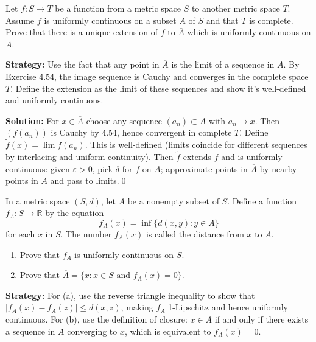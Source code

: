 \begin{problembox}
\begin{problemstatement}
Let $f : S \to T$ be a function from a metric space $S$ to another metric space $T$. Assume $f$ is uniformly continuous on a subset $A$ of $S$ and that $T$ is complete. Prove that there is a unique extension of $f$ to $\overline{A}$ which is uniformly continuous on $\overline{A}$.
\end{problemstatement}
\end{problembox}

\noindent\textbf{Strategy:} Use the fact that any point in $\overline{A}$ is the limit of a sequence in $A$. By Exercise 4.54, the image sequence is Cauchy and converges in the complete space $T$. Define the extension as the limit of these sequences and show it's well-defined and uniformly continuous.

\bigskip\noindent\textbf{Solution:}
For $x\in\overline{A}$ choose any sequence $(a_n)\subset A$ with $a_n\to x$. Then $(f(a_n))$ is Cauchy by 4.54, hence convergent in complete $T$. Define $\tilde f(x)=\lim f(a_n)$. This is well-defined (limits coincide for different sequences by interlacing and uniform continuity). Then $\tilde f$ extends $f$ and is uniformly continuous: given $\varepsilon>0$, pick $\delta$ for $f$ on $A$; approximate points in $\overline{A}$ by nearby points in $A$ and pass to limits.\qed



\begin{problembox}
\begin{problemstatement}
In a metric space $(S, d)$, let $A$ be a nonempty subset of $S$. Define a function $f_A : S \to \mathbb{R}$ by the equation
\[f_A(x) = \inf \{d(x, y) : y \in A\}\]
for each $x$ in $S$. The number $f_A(x)$ is called the distance from $x$ to $A$.
\begin{enumerate}[label=(\alph*)]
\item Prove that $f_A$ is uniformly continuous on $S$.
\item Prove that $\overline{A} = \{x : x \in S \text{ and } f_A(x) = 0\}$.
\end{enumerate}
\end{problemstatement}
\end{problembox}

\noindent\textbf{Strategy:} For (a), use the reverse triangle inequality to show that $|f_A(x) - f_A(z)| \leq d(x,z)$, making $f_A$ 1-Lipschitz and hence uniformly continuous. For (b), use the definition of closure: $x \in \overline{A}$ if and only if there exists a sequence in $A$ converging to $x$, which is equivalent to $f_A(x) = 0$.


